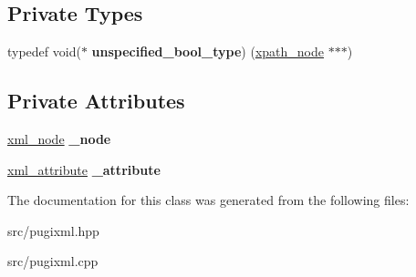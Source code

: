 \subsection*{Private Types}
\begin{DoxyCompactItemize}
\item 
\mbox{\label{classpugi_1_1xpath__node_a20af040b1da211e39c62835489a85664}} 
typedef void($\ast$ {\bfseries unspecified\+\_\+bool\+\_\+type}) (\hyperlink{classpugi_1_1xpath__node}{xpath\+\_\+node} $\ast$$\ast$$\ast$)
\end{DoxyCompactItemize}
\subsection*{Private Attributes}
\begin{DoxyCompactItemize}
\item 
\mbox{\label{classpugi_1_1xpath__node_a3df124023a761ec472dc388c7c58d97b}} 
\hyperlink{classpugi_1_1xml__node}{xml\+\_\+node} {\bfseries \+\_\+node}
\item 
\mbox{\label{classpugi_1_1xpath__node_ad350d72b8d8836d61bca90a23426cf1e}} 
\hyperlink{classpugi_1_1xml__attribute}{xml\+\_\+attribute} {\bfseries \+\_\+attribute}
\end{DoxyCompactItemize}


The documentation for this class was generated from the following files\+:\begin{DoxyCompactItemize}
\item 
src/pugixml.\+hpp\item 
src/pugixml.\+cpp\end{DoxyCompactItemize}
